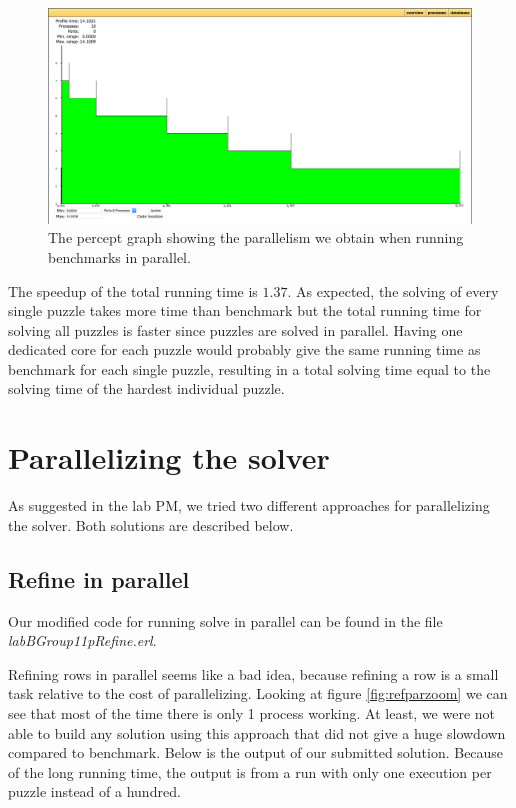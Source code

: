 \documentclass[a4paper]{article}
\begin{document}
\begin{figure}[!htb]
\begin{center}
\includegraphics[scale=0.2]{bencmarks_in_parallel}
\caption{The percept graph showing the parallelism we obtain when running benchmarks in parallel.}
\label{fig:benchpar}
\end{center}
\end{figure}

The speedup of the total running time is $1.37$. As expected, the solving of every single puzzle takes more time than benchmark but the total running time for solving all puzzles is faster since puzzles are solved in parallel. Having one dedicated core for each puzzle would probably give the same running time as benchmark for each single puzzle, resulting in a total solving time equal to the solving time of the hardest individual puzzle.

\newpage
\section{Parallelizing the solver}
As suggested in the lab PM, we tried two different approaches for parallelizing the solver. Both solutions are described below.

\subsection{Refine in parallel}
Our modified code for running solve in parallel can be found in the file \textit{labBGroup11\textunderscore pRefine.erl}.

Refining rows in parallel seems like a bad idea, because refining a row is a small task relative to the cost of parallelizing. Looking at figure \ref{fig:refparzoom} we can see that most of the time there is only 1 process working. At least, we were not able to build any solution using this approach that did not give a huge slowdown compared to benchmark. Below is the output of our submitted solution. Because of the long running time, the output is from a run with only one execution per puzzle instead of a hundred.
\end{document}
